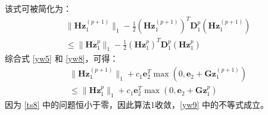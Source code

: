 \documentclass{beamer}
\begin{document}
\begin{frame}[allowframebreaks]
该式可被简化为：
\begin{equation}
\begin{aligned}
&\|\mathbf{Hz}^{(p+1)}_{1}\|_{1}-\frac{1}{2}(\mathbf{Hz}^{(p+1)}_{1})^{T}\mathbf{D}^{p}_{1}(\mathbf{Hz}^{(p+1)}_{1})\\
&\le\|\mathbf{Hz}^{p}_{1}\|_{1}-\frac{1}{2}(\mathbf{Hz}^{p}_{1})^{T}\mathbf{D}^{p}_{1}(\mathbf{Hz}^{p}_{1})     \end{aligned}
\label{yw8}
\end{equation}
综合式 \eqref{yw5} 和 \eqref{yw8}，可得：
\begin{equation}
\begin{aligned}
&\|\mathbf{Hz}^{(p+1)}_{1}\|_{1}+c_{1}\mathbf{e}^{T}_{2}\mathop{\max}(0,\mathbf{e}_{2}+\mathbf{Gz}^{(p+1)}_{1})\\
&\le\|\mathbf{Hz}^{p}_{1}\|_{1}+c_{1}\mathbf{e}^{T}_{2}\mathop{\max}(0,\mathbf{e}_{2}+\mathbf{Gz}^{p}_{1})
\end{aligned}
\label{yw9}
\end{equation}
因为 \eqref{ts8} 中的问题恒小于零，因此算法1收敛，\eqref{yw9} 中的不等式成立。
\end{frame}
\end{document}
